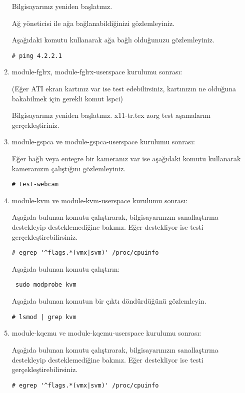 \documentclass[a4paper,10pt]{article}
\begin{document}
\begin{enumerate}
Bilgisayarınız yeniden başlatınız.

Ağ yöneticisi ile ağa bağlanabildiğinizi gözlemleyiniz.

Aşağıdaki komutu kullanarak ağa bağlı olduğunuzu gözlemleyiniz.
\begin{verbatim}
# ping 4.2.2.1 
\end{verbatim}

\item module-fglrx, module-fglrx-userspace  kurulumu sonrası: 

(Eğer ATI ekran kartınız var ise test edebilirsiniz, kartınızın ne olduğuna bakabilmek için gerekli komut lspci)

Bilgisayarınız yeniden başlatınız. x11-tr.tex zorg test aşamalarını gerçekleştiriniz.

\item module-gspca ve module-gspca-userspace kurulumu sonrası:

Eğer bağlı veya entegre bir kameranız var ise aşağıdaki komutu kullanarak kameranızın çalıştığını gözlemleyiniz.
\begin{verbatim}
# test-webcam
\end{verbatim}

\item module-kvm ve module-kvm-userspace kurulumu sonrası:

Aşağıda bulunan komutu çalıştırarak, bilgisayarınızın sanallaştırma destekleyip desteklemediğine bakınız. Eğer destekliyor ise testi gerçekleştirebilirsiniz. 
\begin{verbatim}
# egrep '^flags.*(vmx|svm)' /proc/cpuinfo	
\end{verbatim}

Aşağıda bulunan komutu çalıştırın:

\begin{verbatim}
 sudo modprobe kvm
\end{verbatim}

Aşağıda bulunan komutun bir çıktı döndürdüğünü gözlemleyin.
\begin{verbatim}
# lsmod | grep kvm
\end{verbatim}

\item module-kqemu ve module-kqemu-userspace kurulumu sonrası:

Aşağıda bulunan komutu çalıştırarak, bilgisayarınızın sanallaştırma destekleyip desteklemediğine bakınız. Eğer destekliyor ise testi gerçekleştirebilirsiniz. 
\begin{verbatim}
# egrep '^flags.*(vmx|svm)' /proc/cpuinfo
\end{verbatim}


\end{enumerate}
\end{document}

